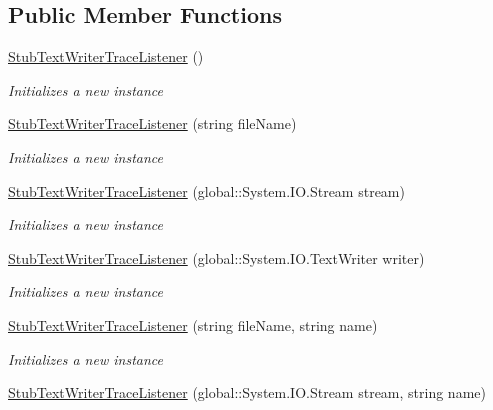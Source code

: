 \subsection*{Public Member Functions}
\begin{DoxyCompactItemize}
\item 
\hyperlink{class_system_1_1_diagnostics_1_1_fakes_1_1_stub_text_writer_trace_listener_a981c2d5d038ecdc3e6efec04c662afd7}{Stub\-Text\-Writer\-Trace\-Listener} ()
\begin{DoxyCompactList}\small\item\em Initializes a new instance\end{DoxyCompactList}\item 
\hyperlink{class_system_1_1_diagnostics_1_1_fakes_1_1_stub_text_writer_trace_listener_a0d3b60a2dfe62f0d0e3afc6da851c12b}{Stub\-Text\-Writer\-Trace\-Listener} (string file\-Name)
\begin{DoxyCompactList}\small\item\em Initializes a new instance\end{DoxyCompactList}\item 
\hyperlink{class_system_1_1_diagnostics_1_1_fakes_1_1_stub_text_writer_trace_listener_a6061c15d22457341781f025213d50389}{Stub\-Text\-Writer\-Trace\-Listener} (global\-::\-System.\-I\-O.\-Stream stream)
\begin{DoxyCompactList}\small\item\em Initializes a new instance\end{DoxyCompactList}\item 
\hyperlink{class_system_1_1_diagnostics_1_1_fakes_1_1_stub_text_writer_trace_listener_a25cf6e1689eddf2a15e5e4845d1caa4b}{Stub\-Text\-Writer\-Trace\-Listener} (global\-::\-System.\-I\-O.\-Text\-Writer writer)
\begin{DoxyCompactList}\small\item\em Initializes a new instance\end{DoxyCompactList}\item 
\hyperlink{class_system_1_1_diagnostics_1_1_fakes_1_1_stub_text_writer_trace_listener_a7fdd00c7f31f4e4b6461f89c54a9caf9}{Stub\-Text\-Writer\-Trace\-Listener} (string file\-Name, string name)
\begin{DoxyCompactList}\small\item\em Initializes a new instance\end{DoxyCompactList}\item 
\hyperlink{class_system_1_1_diagnostics_1_1_fakes_1_1_stub_text_writer_trace_listener_a6e6fc97aa2d42c92690c50e082c4de09}{Stub\-Text\-Writer\-Trace\-Listener} (global\-::\-System.\-I\-O.\-Stream stream, string name)

\end{DoxyCompactItemize}
